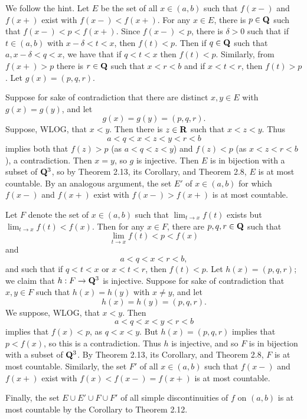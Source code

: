 \begin{ex}
We follow the hint. Let $E$ be the set of all $x \in (a, b)$ such that $f(x-)$ and $f(x+)$ exist with $f(x-) < f(x+)$. For any $x \in E$, there is $p \in \mathbf{Q}$ such that $f(x-) < p < f(x+)$. Since $f(x-) < p$, there is $\delta > 0$ such that if $t \in (a, b)$ with $x - \delta < t < x$, then $f(t) < p$. Then if $q \in \mathbf{Q}$ such that $a, x-\delta < q < x$, we have that if $q < t < x$ then $f(t) < p$. Similarly, from $f(x+) > p$ there is $r \in \mathbf{Q}$ such that $x < r < b$ and if $x < t < r$, then $f(t) > p$. Let $g(x) = (p, q, r)$.

Suppose for sake of contradiction that there are distinct $x, y \in E$ with $g(x) = g(y)$, and let \[g(x) = g(y) = (p, q, r).\] Suppose, WLOG, that $x < y$. Then there is $z \in \mathbf{R}$ such that $x < z < y$. Thus \[a < q < x < z < y < r < b\] implies both that $f(z) > p$ (as $a < q < z < y$) and $f(z) < p$ (as $x < z < r < b$), a contradiction. Then $x = y$, so $g$ is injective. Then $E$ is in bijection with a subset of $\mathbf{Q}^3$, so by Theorem 2.13, its Corollary, and Theorem 2.8, $E$ is at most countable. By an analogous argument, the set $E'$ of $x \in (a, b)$ for which $f(x-)$ and $f(x+)$ exist with $f(x-) > f(x+)$ is at most countable.

Let $F$ denote the set of $x \in (a, b)$ such that $\lim_{t \to x}f(t)$ exists but $\lim_{t\to x}f(t) < f(x)$. Then for any $x \in F$, there are $p, q, r \in \mathbf{Q}$ such that \[\lim_{t\to x}f(t) < p < f(x)\] and \[a < q < x < r < b,\] and such that if $q < t < x$ or $x < t < r$, then $f(t) < p$. Let $h(x) = (p, q, r)$; we claim that $h: F \to \mathbf{Q}^3$ is injective. Suppose for sake of contradiction that $x, y \in F$ such that $h(x) = h(y)$ with $x \not = y$, and let \[h(x) = h(y) = (p, q, r).\] We suppose, WLOG, that $x < y$. Then \[a < q < x < y < r < b\] implies that $f(x) < p$, as $q < x < y$. But $h(x) = (p, q, r)$ implies that $p < f(x)$, so this is a contradiction. Thus $h$ is injective, and so $F$ is in bijection with a subset of $\mathbf{Q}^3$. By Theorem 2.13, its Corollary, and Theorem 2.8, $F$ is at most countable. Similarly, the set $F'$ of all $x \in (a, b)$ such that $f(x-)$ and $f(x+)$ exist with $f(x) < f(x-) = f(x+)$ is at most countable.

Finally, the set $E\cup E'\cup F\cup F'$ of all simple discontinuities of $f$ on $(a, b)$ is at most countable by the Corollary to Theorem 2.12.
\end{ex}

\begin{ex}

\end{ex}

